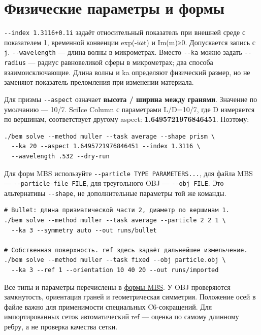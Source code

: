 \documentclass[
  russian,
  11pt,
  a4paper,
]{report}
\begin{document}
\section{Физические параметры и
формы}\label{ux444ux438ux437ux438ux447ux435ux441ux43aux438ux435-ux43fux430ux440ux430ux43cux435ux442ux440ux44b-ux438-ux444ux43eux440ux43cux44b}

\nolinkurl{--index 1.3116+0.1i} задаёт относительный показатель при
внешней среде с показателем 1, временной конвенции exp(-iωt) и Im(m)≥0.
Допускается запись с \nolinkurl{j}. \nolinkurl{--wavelength} --- длина
волны в микрометрах. Вместо \nolinkurl{--ka} можно задать
\nolinkurl{--radius} --- радиус равновеликой сферы в микрометрах; два
способа взаимоисключающие. Длина волны и ka определяют физический
размер, но не заменяют показатель преломления при изменении материала.

Для призмы \nolinkurl{--aspect} означает \textbf{высота / ширина между
гранями}. Значение по умолчанию --- 10/7. SciIce Column с параметрами
L/D=10/7, где D измеряется по вершинам, соответствует другому aspect:
\textbf{1.6495721976846451}. Поэтому:

\begin{verbatim}
./bem solve --method muller --task average --shape prism \
  --ka 20 --aspect 1.6495721976846451 --index 1.3116 \
  --wavelength .532 --dry-run
\end{verbatim}

Для форм MBS используйте \nolinkurl{--particle TYPE PARAMETERS...}, для
файла MBS --- \nolinkurl{--particle-file FILE}, для треугольного OBJ ---
\nolinkurl{--obj FILE}. Это альтернативы \nolinkurl{--shape}, не
дополнительные параметры той же команды.

\begin{verbatim}
# Bullet: длина призматической части 2, диаметр по вершинам 1.
./bem solve --method muller --task average --particle 2 2 1 \
  --ka 3 --symmetry auto --out runs/bullet

# Собственная поверхность. ref здесь задаёт дальнейшее измельчение.
./bem solve --method muller --task fixed --obj particle.obj \
  --ka 3 --ref 1 --orientation 10 40 20 --out runs/imported
\end{verbatim}

Все типы и параметры перечислены в
\href{docs/mbs_particle_shapes.md}{формы MBS}. У OBJ проверяются
замкнутость, ориентация граней и геометрическая симметрия. Положение
осей в файле важно для применимости специальных C6-сокращений. Для
импортированных сеток автоматический ref --- оценка по самому длинному
ребру, а не проверка качества сетки.
\end{document}
